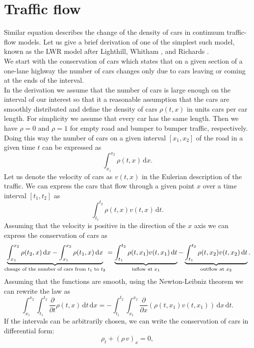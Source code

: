 \documentclass[../include.tex]{subfiles}
\begin{document}
\section{Traffic flow}
Similar equation describes the change of the density of cars in continuum traffic-flow models. Let us give a brief derivation of one of the simplest such model, known as the LWR model after Lighthill, Whitham \cite{lighthillwitham}, and Richards  \cite{richards}.\\
We start with the conservation of cars which states that on a given section of a one-lane highway the number of cars changes only due to cars leaving or coming at the ends of the interval.\\
In the derivation we assume that the number of cars is large enough on the interval of our interest so that it a reasonable assumption  that the cars are smoothly distributed and define the density of cars $ \rho (t,x) $ in units cars per car length. For simplicity we assume that every car has the same length. Then we have $ \rho = 0 $ and $ \rho = 1 $ for empty road and bumper to bumper traffic, respectively. Doing this way the number of cars on a given interval $ \left[x_1, x_2\right] $ of the road in a given time $ t $ can be expressed as
\[
\int_{x_1}^{x_2} \rho (t,x)\,\mathrm{d}x.
\]
Let us denote the velocity of cars as $ v(t,x) $ in the Eulerian description of the traffic. We can express the cars that flow through a given point $ x $ over a time interval $ [t_1, t_2] $ as
\[
\int_{t_1}^{t_2} \rho(t,x) v(t,x)\,\mathrm{d}t.
\]
Assuming that the velocity is positive in the direction of the $ x $ axis we can express the conservation of cars as
\[
\underbrace{\int_{x_1}^{x_2} \rho (t_2,x)\,\mathrm{d}x - \int_{x_1}^{x_2} \rho (t_1,x)\,\mathrm{d}x}_{\text{change of the number of cars from $ t_1 $ to $ t_2 $}} = 
\underbrace{\int_{t_1}^{t_2} \rho(t,x_1) v(t,x_1)\,\mathrm{d}t}_{\text{inflow at }x_1} - 
\underbrace{\int_{t_1}^{t_2} \rho(t,x_2) v(t,x_2)\,\mathrm{d}t}_{\text{outflow at }x_2}.
\]
Assuming that the functions are smooth, using the Newton-Leibniz theorem we can rewrite the law as
\[
\int_{x_1}^{x_2} \int_{t_1}^{t_2} \frac{\partial}{\partial t}\rho(t,x) \,\mathrm{d}t\, \mathrm{d}x = -\int_{t_1}^{t_2} \int_{x_1}^{x_2} \frac{\partial}{\partial x} \left(\rho(t,x_1) v(t,x_1)\right)\, \mathrm{d}x\, \mathrm{d}t.
\]
If the intervals can be arbitrarily chosen, we can write the conservation of cars in differential form:
\begin{equation}
	\label{conservation_cars_0}
	\rho_t + (\rho\,v)_x = 0,
\end{equation}
\end{document}
